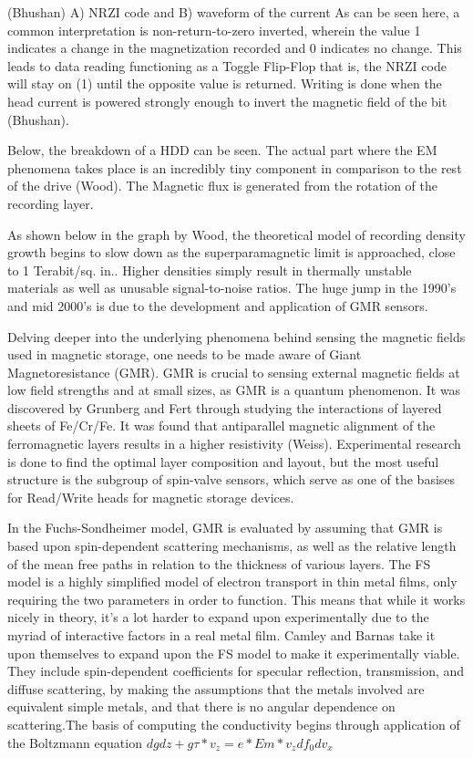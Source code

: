 \documentclass[11pt]{article}
\begin{document}
\begin{multicols}{2}
(Bhushan) A) NRZI code and B) waveform of the current
As can be seen here, a common interpretation is non-return-to-zero inverted, wherein the value 1 indicates a change in the magnetization recorded and 0 indicates no change. This leads to data reading functioning as a Toggle Flip-Flop that is, the NRZI code will stay on (1) until the opposite value is returned. Writing is done when the head current is powered strongly enough to invert the magnetic field of the bit (Bhushan). 

Below, the breakdown of a HDD can be seen. The actual part where the EM phenomena takes place is an incredibly tiny component in comparison to the rest of the drive (Wood). The Magnetic flux is generated from the rotation of the recording layer. 

As shown below in the graph by Wood, the theoretical model of recording density growth begins to slow down as the superparamagnetic limit is approached, close to 1 Terabit/sq. in.. Higher densities simply result in thermally unstable materials as well as unusable signal-to-noise ratios. The huge jump in the 1990’s and mid 2000’s is due to the development and application of GMR sensors.

Delving deeper into the underlying phenomena behind sensing the magnetic fields used in magnetic storage, one needs to be made aware of Giant Magnetoresistance (GMR). GMR is crucial to sensing external magnetic fields at low field strengths and at small sizes, as GMR is a quantum phenomenon. It was discovered by Grunberg and Fert through studying the interactions of layered sheets of Fe/Cr/Fe. It was found that antiparallel magnetic alignment of the ferromagnetic layers results in a higher resistivity (Weiss). Experimental research is done to find the optimal layer composition and layout, but the most useful structure is the subgroup of spin-valve sensors, which serve as one of the basises for Read/Write heads for magnetic storage devices.

In the Fuchs-Sondheimer model, GMR is evaluated by assuming that GMR is based upon spin-dependent scattering mechanisms, as well as the relative length of the mean free paths in relation to the thickness of various layers. The FS model is a highly simplified model of electron transport in thin metal films, only requiring the two parameters in order to function. This means that while it works nicely in theory, it’s a lot harder to expand upon experimentally due to the myriad of interactive factors in a real metal film. Camley and Barnas take it upon themselves to expand upon the FS model to make it experimentally viable. They include spin-dependent coefficients for specular reflection, transmission, and diffuse scattering, by making the assumptions that the metals involved are equivalent simple metals, and that there is no angular dependence on scattering.The basis of computing the conductivity begins through application of the Boltzmann equation
$dg dz + g τ*v_z = e*E m*v_z df_0 dv_x$


\end{multicols}
\end{document}

